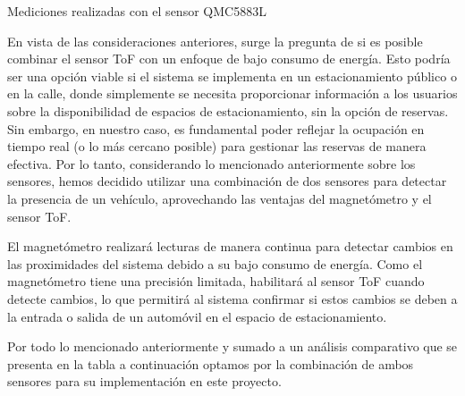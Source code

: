 \begin{images}[\label{QMC5883L_PLOT}]{Mediciones realizadas con el sensor QMC5883L}
\end{images}

En vista de las consideraciones anteriores, surge la pregunta de si es posible combinar el sensor ToF con un enfoque de bajo consumo de energía. Esto podría ser una opción viable si el sistema se implementa en un estacionamiento público o en la calle, donde simplemente se necesita proporcionar información a los usuarios sobre la disponibilidad de espacios de estacionamiento, sin la opción de reservas. Sin embargo, en nuestro caso, es fundamental poder reflejar la ocupación en tiempo real (o lo más cercano posible) para gestionar las reservas de manera efectiva. Por lo tanto, considerando lo mencionado anteriormente sobre los sensores, hemos decidido utilizar una combinación de dos sensores para detectar la presencia de un vehículo, aprovechando las ventajas del magnetómetro y el sensor ToF.

El magnetómetro realizará lecturas de manera continua para detectar cambios en las proximidades del sistema debido a su bajo consumo de energía. Como el magnetómetro tiene una precisión limitada, habilitará al sensor ToF cuando detecte cambios, lo que permitirá al sistema confirmar si estos cambios se deben a la entrada o salida de un automóvil en el espacio de estacionamiento.

Por todo lo mencionado anteriormente y sumado a un análisis comparativo que se presenta en la tabla a continuación optamos por la combinación de ambos sensores para su implementación en este proyecto.

